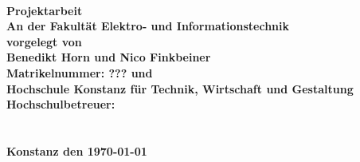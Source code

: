 \begin{titlepage}
\vspace*{-3cm}
    \begin{figure}[ht]
        \hspace{7cm}
    \end{figure}
        
	\begin{center}
		\vspace*{1cm}
		\LARGE\bf\myTopic\\
		\vspace*{1cm}
		\normalsize\rm
		\vspace*{1cm}
		\textbf{Projektarbeit}\\
		\vspace*{0.5cm}
		An der Fakultät Elektro- und Informationstechnik \\
		\vspace*{0.5cm}
		vorgelegt von  \\
	    \vspace*{0.25cm}
		\textbf{Benedikt Horn und Nico Finkbeiner}  \\
		\vspace*{0.25cm}
		Matrikelnummer: ??? und \myMatrikelnummer \\
		\vspace*{1cm}
		Hochschule Konstanz für Technik, Wirtschaft und Gestaltung \\
		\vspace*{1cm}
		Hochschulbetreuer: \\
		\textbf{\mySupervisorTwo}\\
		\textbf{\mySupervisor}\\
		\vspace*{1cm}
		\textbf{Konstanz den \today}
	\end{center}
\end{titlepage}
\newpage
\setcounter{page}{2}

